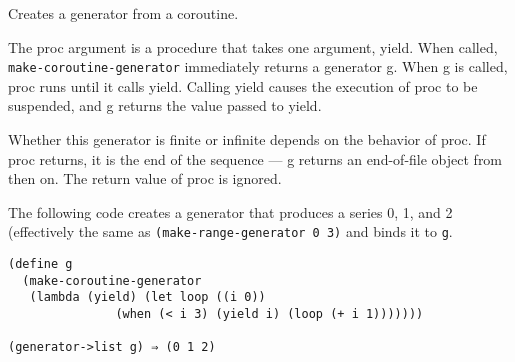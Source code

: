\begin{entry}{%
  }

  Creates a
  generator from a coroutine.

  The proc argument is a procedure that takes one argument,
  yield. When called, \texttt{make-coroutine-generator} immediately
  returns a generator g. When g is called, proc runs until it calls
  yield. Calling yield causes the execution of proc to be suspended,
  and g returns the value passed to yield.

  Whether this generator is finite or infinite depends on the behavior
  of proc. If proc returns, it is the end of the sequence --- g
  returns an end-of-file object from then on. The return value of proc
  is ignored.

  The following code creates a generator that produces a series 0, 1,
  and 2 (effectively the same as \texttt{(make-range-generator\ 0\ 3)}
  and binds it to \texttt{g}.

\begin{verbatim}
(define g
  (make-coroutine-generator
   (lambda (yield) (let loop ((i 0))
               (when (< i 3) (yield i) (loop (+ i 1)))))))

(generator->list g) ⇒ (0 1 2)
\end{verbatim}
\end{entry}


